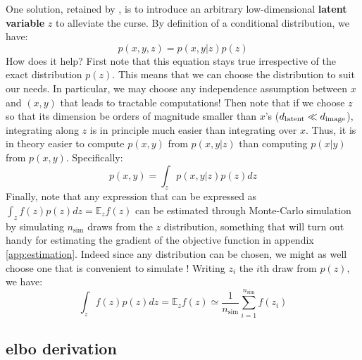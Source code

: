 \documentclass{article}
\begin{document}
\begin{appendix}
\begin{multicols}{2}
One solution, retained by \citet{zeroshot}, is to introduce an arbitrary low-dimensional \textbf{latent variable} $z$ to alleviate the curse. By definition of a conditional distribution, we have:
$$p(x,y,z)=p(x,y | z) p(z)$$
How does it help? First note that this equation stays true irrespective of the exact distribution $p(z)$. This means that we can choose the distribution to suit our needs. In particular, we may choose any independence assumption between $x$ and $(x,y)$ that leads to tractable computations! Then note that if we choose $z$ so that its dimension be orders of magnitude smaller than $x$'s (${d_{\mathrm{latent}}}\ll d_{\mathrm{image}}$), integrating along $z$ is in principle much easier than integrating over $x$. Thus, it is in theory easier to compute $p(x,y)$ from $p(x,y | z)$ than computing $p(x|y)$ from $p(x,y)$. Specifically:
$$p(x,y)=\int_z p(x,y | z) p(z) dz$$
Finally, note that any expression that can be expressed as $\int_z f(z) p(z) dz=\mathbb{E}_z f(z)$ can be estimated through Monte-Carlo simulation by simulating $n_\text{sim}$ draws from the $z$ distribution, something that will turn out handy for estimating the gradient of the objective function in appendix \ref{app:estimation}. Indeed since any distribution can be chosen, we might as well choose one that is convenient to simulate ! Writing $z_i$ the $i$th draw from $p(z)$, we have:
$$\int_z f(z) p(z) dz=\mathbb{E}_z f(z)\simeq \frac{1}{n_\text{sim}}\sum_{i=1}^{n_\text{sim}} f(z_i)$$

\end{multicols}

\clearpage

\subsection{\gls{elbo} derivation} \label{app:elbo}


\end{appendix}
\end{document}
